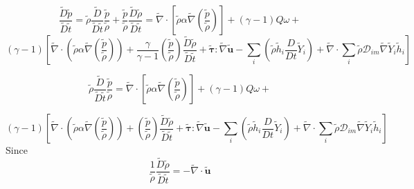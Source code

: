\documentclass[preprint,12pt,authoryear]{elsarticle}
\begin{document}
{\newpage

\[
         \frac{\tilde{D}  \tilde{p}} {\tilde{D}\tilde{t} }
         =
         \tilde{\rho}  
         \frac{\tilde{D} } {\tilde{D}\tilde{t} }
         \frac{ \tilde{p}}{ \tilde{\rho}}
         +
         \frac{ \tilde{p}}{ \tilde{\rho}}
         \frac{\tilde{D} \tilde{\rho}} {\tilde{D}\tilde{t} }
        = 
		\tilde{\nabla} \cdot 
			\left[ \tilde{\rho} \alpha
		\tilde{\nabla} (\frac{ \tilde{p} }{  \tilde{\rho} } )\right]
                +
        (\gamma - 1) Q \omega
        +
\]
\[
        (\gamma - 1)
        \left[
        \tilde{\nabla} \cdot 
		\left( 
		\tilde{\rho} \alpha
		\tilde{\nabla} (\frac{ \tilde{p} }{  \tilde{\rho} } )
		\right)
        +
        \frac{ \gamma }{ \gamma - 1 }
        (\frac{ \tilde{p} }{  \tilde{\rho} } )
		 \frac{\tilde{D}\tilde{\rho} } {\tilde{D}\tilde{t}}
		 +
        \pmb{\tilde{\tau}}:\tilde{\nabla} \tilde{\mathbf{u}} 
        -
        \sum\limits_i
        \left(
                 \tilde{\rho}\tilde{h}_i
                \frac{D}{Dt}
		\tilde{Y}_i
		\right)
        +
        \tilde{\nabla} \cdot
        \sum\limits_i 
        \tilde{\rho}\mathcal{D}_{im}\tilde{\nabla}\tilde{Y}_i     
        \tilde{h}_i
        \right]
\]

\[
         \tilde{\rho}  
         \frac{\tilde{D} } {\tilde{D}\tilde{t} }
         \frac{ \tilde{p}}{ \tilde{\rho}}
        = 
		\tilde{\nabla} \cdot 
			\left[ \tilde{\rho} \alpha
		\tilde{\nabla} (\frac{ \tilde{p} }{  \tilde{\rho} } )\right]
                +
        (\gamma - 1) Q \omega
        +
\]

\[
        (\gamma - 1)
        \left[
        \tilde{\nabla} \cdot 
		\left( 
		\tilde{\rho} \alpha
		\tilde{\nabla} (\frac{ \tilde{p} }{  \tilde{\rho} } )
		\right)
        +
        (\frac{ \tilde{p} }{  \tilde{\rho} } )
		 \frac{\tilde{D}\tilde{\rho} } {\tilde{D}\tilde{t}}
		 +
        \pmb{\tilde{\tau}}:\tilde{\nabla} \tilde{\mathbf{u}} 
        -
        \sum\limits_i
        \left(
                 \tilde{\rho}\tilde{h}_i
                \frac{D}{Dt}
		\tilde{Y}_i
		\right)
        +
        \tilde{\nabla} \cdot
        \sum\limits_i 
        \tilde{\rho}\mathcal{D}_{im}\tilde{\nabla}\tilde{Y}_i     
        \tilde{h}_i
        \right]
\]
Since
\[   \frac{1} {  \tilde{\rho} } 
		 \frac{\tilde{D}\tilde{\rho} } {\tilde{D}\tilde{t}}
	 =
	 - \tilde{\nabla} \cdot \tilde{\mathbf{u}}
\]





}
\end{document}
